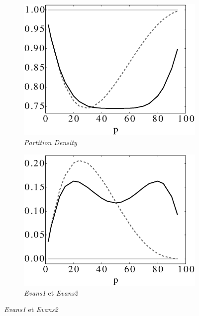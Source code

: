 \begin{figure}[h]
\centering
	\begin{subfigure}{0.35\linewidth}
		\includegraphics[width=\linewidth]{img/ExpectedNodes/1Clique/Clique_Partitiondensity.eps}
		\caption{\label{fig:1CAhn}\emph{Partition Density}}		
	\end{subfigure}\hspace*{1cm}
	\begin{subfigure}{0.35\linewidth}
		\includegraphics[width=\linewidth]{img/ExpectedNodes/1Clique/Clique_Evans1.eps}
		\caption{\label{fig:1CE2}\emph{Evans1} et \emph{Evans2}}		
	\end{subfigure}


\end{figure}
